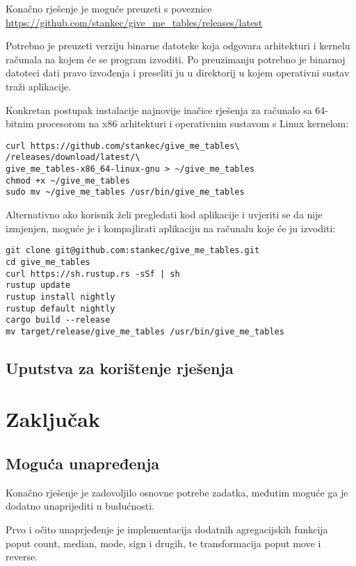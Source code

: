 \documentclass[times, utf8, zavrsni]{fer}
\begin{document}
Konačno rješenje je moguće preuzeti s poveznice
\url{https://github.com/stankec/give_me_tables/releases/latest}

Potrebno je preuzeti verziju binarne datoteke koja odgovara arhitekturi i
kernelu računala na kojem će se program izvoditi. Po preuzimanju potrebno je
binarnoj datoteci dati pravo izvođenja i preseliti ju u direktorij u kojem
operativni sustav traži aplikacije.

Konkretan postupak instalacije najnovije inačice rješenja za računalo sa
64-bitnim procesorom na x86 arhitekturi i operativnim sustavom s Linux kernelom:

\begin{lstlisting}
curl https://github.com/stankec/give_me_tables\
/releases/download/latest/\
give_me_tables-x86_64-linux-gnu > ~/give_me_tables
chmod +x ~/give_me_tables
sudo mv ~/give_me_tables /usr/bin/give_me_tables
\end{lstlisting}

Alternativno ako korisnik želi pregledati kod aplikacije i uvjeriti se da nije
izmjenjen, moguće je i kompajlirati aplikaciju na računalu koje će ju izvoditi:

\begin{lstlisting}
git clone git@github.com:stankec/give_me_tables.git
cd give_me_tables
curl https://sh.rustup.rs -sSf | sh
rustup update
rustup install nightly
rustup default nightly
cargo build --release
mv target/release/give_me_tables /usr/bin/give_me_tables
\end{lstlisting}

\section{Uputstva za korištenje rješenja}



\chapter{Zaključak}

\section{Moguća unapređenja}

Konačno rješenje je zadovoljilo osnovne potrebe zadatka, međutim moguće ga je
dodatno unaprijediti u budućnosti.

Prvo i očito unaprjeđenje je implementacija dodatnih agregacijskih funkcija
poput count, median, mode, sign i drugih, te transformacija poput move i
reverse.
\end{document}

